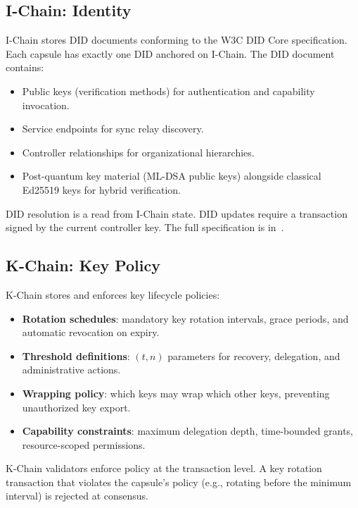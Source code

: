 \subsection{I-Chain: Identity}\label{sec:ichain}

I-Chain stores DID documents conforming to the W3C DID Core specification.
Each capsule has exactly one DID anchored on I-Chain. The DID document contains:

\begin{itemize}[nosep]
  \item Public keys (verification methods) for authentication and capability
        invocation.
  \item Service endpoints for sync relay discovery.
  \item Controller relationships for organizational hierarchies.
  \item Post-quantum key material (ML-DSA public keys) alongside classical
        Ed25519 keys for hybrid verification.
\end{itemize}

DID resolution is a read from I-Chain state. DID updates require a transaction
signed by the current controller key. The full specification is
in~\cite{lux-id-did}.

\subsection{K-Chain: Key Policy}\label{sec:kchain}

K-Chain stores and enforces key lifecycle policies:

\begin{itemize}[nosep]
  \item \textbf{Rotation schedules}: mandatory key rotation intervals, grace
        periods, and automatic revocation on expiry.
  \item \textbf{Threshold definitions}: $(t, n)$ parameters for recovery,
        delegation, and administrative actions.
  \item \textbf{Wrapping policy}: which keys may wrap which other keys,
        preventing unauthorized key export.
  \item \textbf{Capability constraints}: maximum delegation depth, time-bounded
        grants, resource-scoped permissions.
\end{itemize}

K-Chain validators enforce policy at the transaction level. A key rotation
transaction that violates the capsule's policy (e.g., rotating before the
minimum interval) is rejected at consensus.

